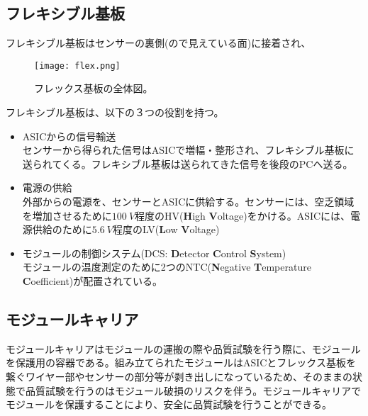 

\subsection{フレキシブル基板}
\label{sec:flex}

フレキシブル基板はセンサーの裏側(ので見えている面)に接着され、

\begin{figure}[tbp]
  \centering
  \texttt{[image: flex.png]}
  \caption[フレックス基板]{フレックス基板の全体図。}
  \label{fig:flex}
\end{figure}

フレキシブル基板は、以下の３つの役割を持つ。
\begin{itemize}
  \item ASICからの信号輸送  \\
  センサーから得られた信号はASICで増幅・整形され、フレキシブル基板に送られてくる。フレキシブル基板は送られてきた信号を後段のPCへ送る。
  \item 電源の供給 \\
  外部からの電源を、センサーとASICに供給する。センサーには、空乏領域を増加させるために$100\ \si{V}$程度のHV(\textbf{H}igh \textbf{V}oltage)をかける。ASICには、電源供給のために$5.6\ \si{V}$程度のLV(\textbf{L}ow \textbf{V}oltage)
  \item モジュールの制御システム(DCS: \textbf{D}etector \textbf{C}ontrol \textbf{S}ystem) \\
  モジュールの温度測定のために2つのNTC(\textbf{N}egative \textbf{T}emperature \textbf{C}oefficient)が配置されている。
\end{itemize}

\subsection{モジュールキャリア}
\label{sec:carrier}

モジュールキャリアはモジュールの運搬の際や品質試験を行う際に、モジュールを保護用の容器である。組み立てられたモジュールはASICとフレックス基板を繋ぐワイヤー部やセンサーの部分等が剥き出しになっているため、そのままの状態で品質試験を行うのはモジュール破損のリスクを伴う。モジュールキャリアでモジュールを保護することにより、安全に品質試験を行うことができる。

